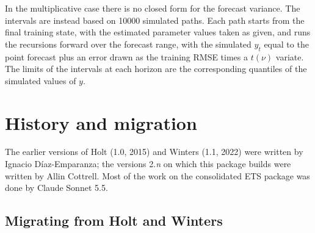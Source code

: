\documentclass{article}
\begin{document}
In the multiplicative case there is no closed form for the forecast
variance. The intervals are instead based on 10000 simulated paths.
Each path starts from the final training state, with the estimated
parameter values taken as given, and runs the recursions forward over
the forecast range, with the simulated $y_t$ equal to the point forecast
plus an error drawn as the training RMSE times a $t(\nu)$ variate. The
limits of the intervals at each horizon are the corresponding quantiles
of the simulated values of $y$.

\section{History and migration}
\label{sec:update}

The earlier versions of \textsf{Holt} (1.0, 2015) and \textsf{Winters}
(1.1, 2022) were written by Ignacio Díaz-Emparanza; the versions
2.\textit{n} on which this package builds were written by Allin
Cottrell. Most of the work on the consolidated \textsf{ETS} package was
done by Claude Sonnet 5.5.

\subsection{Migrating from Holt and Winters}
\end{document}
